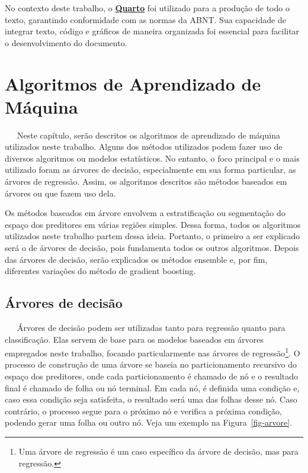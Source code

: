 \documentclass[
  12pt,
  a4paper,
]{scrreprt}
\begin{document}
\vspace{12pt}

No contexto deste trabalho, o
\href{https://quarto.org/}{\textbf{Quarto}} foi utilizado para a
produção de todo o texto, garantindo conformidade com as normas da ABNT.
Sua capacidade de integrar texto, código e gráficos de maneira
organizada foi essencial para facilitar o desenvolvimento do documento.

\chapter{Algoritmos de Aprendizado de
Máquina}\label{algoritmos-de-aprendizado-de-muxe1quina}

~~~Neste capítulo, serão descritos os algoritmos de aprendizado de
máquina utilizados neste trabalho. Alguns dos métodos utilizados podem
fazer uso de diversos algoritmos ou modelos estatísticos. No entanto, o
foco principal e o mais utilizado foram as árvores de decisão,
especialmente em sua forma particular, as árvores de regressão. Assim,
os algoritmos descritos são métodos baseados em árvores ou que fazem uso
dela.

\vspace{12pt}

Os métodos baseados em árvore envolvem a estratificação ou segmentação
do espaço dos preditores em várias regiões simples. Dessa forma, todos
os algoritmos utilizados neste trabalho partem dessa ideia. Portanto, o
primeiro a ser explicado será o de árvores de decisão, pois fundamenta
todos os outros algoritmos. Depois das árvores de decisão, serão
explicados os métodos ensemble e, por fim, diferentes variações do
método de gradient boosting.

\section{Árvores de decisão}\label{uxe1rvores-de-decisuxe3o}

~~~Árvores de decisão podem ser utilizadas tanto para regressão quanto
para classificação. Elas servem de base para os modelos baseados em
árvores empregados neste trabalho, focando particularmente nas árvores
de regressão\footnote{Uma árvore de regressão é um caso específico da
  árvore de decisão, mas para regressão.}. O processo de construção de
uma árvore se baseia no particionamento recursivo do espaço dos
preditores, onde cada particionamento é chamado de nó e o resultado
final é chamado de folha ou nó terminal. Em cada nó, é definida uma
condição e, caso essa condição seja satisfeita, o resultado será uma das
folhas desse nó. Caso contrário, o processo segue para o próximo nó e
verifica a próxima condição, podendo gerar uma folha ou outro nó. Veja
um exemplo na Figura~\ref{fig-arvore}.
\end{document}
